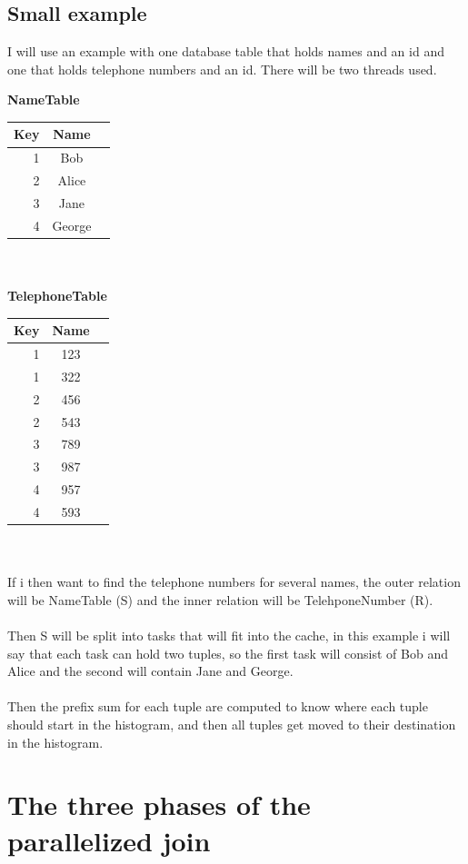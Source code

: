 \documentclass[a4paper,12pt]{article}
\begin{document}
\subsection{Small example}
I will use an example with one database table that holds names and an id and one that holds telephone numbers and an id. There will be two threads used.
\newpage

\textbf{NameTable}\\
\begin{tabular}{| r | c | r |}
\hline
Key & Name \\ \hline
1 & Bob \\ \hline
2 & Alice \\ \hline
3 & Jane \\ \hline
4 & George \\ \hline
\hline
\end{tabular}
\\\\
\textbf{TelephoneTable}\\
\begin{tabular}{| r | c | r |}
\hline
Key & Name \\ \hline
1 & 123 \\ \hline
1 & 322 \\ \hline
2 & 456 \\ \hline
2 & 543 \\ \hline
3 & 789 \\ \hline
3 & 987 \\ \hline
4 & 957 \\ \hline
4 & 593 \\ \hline
\hline
\end{tabular}
\\\\
If i then want to find the telephone numbers for several names,  the outer relation will be NameTable (S) and the inner relation will be TelehponeNumber (R). 
\\\\
Then S will be split into tasks that will fit into the cache, in this example i will say that each task can hold two tuples, so the first task will consist of Bob and Alice
and the second will contain Jane and George.
\\\\
Then the prefix sum for each tuple are computed to know where each tuple should start in the histogram, and then all tuples get moved to their destination in the histogram.\\

\section{The three phases of the parallelized join}
\end{document}
